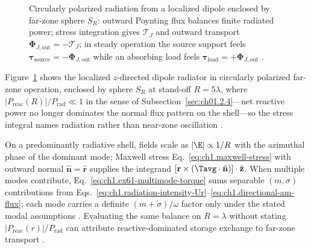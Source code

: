 \begin{figure}[b]
\centering
{}
\caption{Circularly polarized radiation from a localized dipole enclosed by far-zone sphere $S_R$: outward Poynting flux balances finite radiated power; stress integration gives $\boldsymbol{\mathcal{T}}_J$ and outward transport $\boldsymbol{\Phi}_{J,\mathrm{out}}=-\boldsymbol{\mathcal{T}}_J$; in steady operation the source support feels $\boldsymbol{\tau}_{\mathrm{source}}=-\boldsymbol{\Phi}_{J,\mathrm{out}}$ while an absorbing load feels $\boldsymbol{\tau}_{\mathrm{load}}=+\boldsymbol{\Phi}_{J,\mathrm{out}}$ \cite{beth1936,stratton1941}.}
\label{fig:ch1.ex61-beth-helical-sketch}
\end{figure}

Figure~\ref{fig:ch1.ex61-beth-helical-sketch} shows the localized $z$-directed dipole radiator in circularly polarized far-zone operation, enclosed by sphere $S_R$ at stand-off \(R=5\lambda\), where
\(|P_{\mathrm{reac}}(R)|/P_{\mathrm{rad}}\ll 1\) in the sense of Subsection~\ref{sec:ch01.2.4}---net reactive power no longer dominates the normal flux pattern on the shell---so the stress integral names radiation rather than
near-zone oscillation \cite{stratton1941}.

On a predominantly radiative shell, fields scale as \(|\E|\propto 1/R\) with the azimuthal phase of the dominant mode; Maxwell stress Eq.~\eqref{eq:ch1.maxwell-stress} with outward normal \(\hat{\mathbf{n}}=\hat{\mathbf{r}}\) supplies the integrand \([\mathbf{r}\times(\Tavg\cdot\hat{\mathbf{n}})]\cdot\hat{\mathbf{z}}\). When multiple modes contribute, Eq.~\eqref{eq:ch1.ex61-multimode-torque} sums separable \((m,\sigma)\) contributions from Eqs.~\eqref{eq:ch1.radiation-intensity-Ur}--\eqref{eq:ch1.directional-am-flux}; each mode carries a definite \((m+\sigma)/\omega\) factor only under the stated modal assumptions \cite{stratton1941}. Evaluating the same balance on \(R=\lambda\) without stating \(|P_{\mathrm{reac}}(r)|/P_{\mathrm{rad}}\) can attribute reactive-dominated storage exchange to far-zone transport \cite{stratton1941}.

